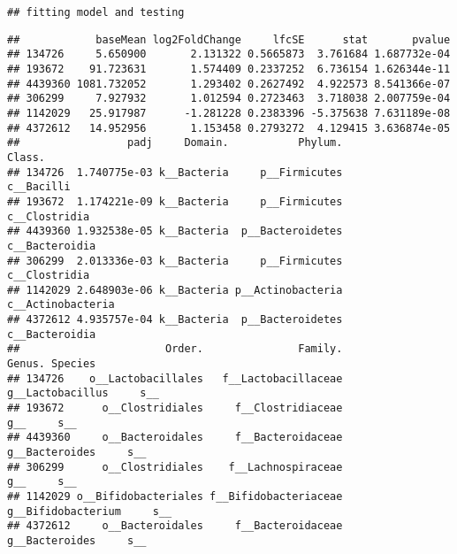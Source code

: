 \documentclass[
]{article}
\newenvironment{Shaded}{\begin{snugshade}}{\end{snugshade}}
\newcommand{\AttributeTok}[1]{\textcolor[rgb]{0.77,0.63,0.00}{#1}}
\newcommand{\ConstantTok}[1]{\textcolor[rgb]{0.00,0.00,0.00}{#1}}
\newcommand{\FloatTok}[1]{\textcolor[rgb]{0.00,0.00,0.81}{#1}}
\newcommand{\FunctionTok}[1]{\textcolor[rgb]{0.00,0.00,0.00}{#1}}
\newcommand{\NormalTok}[1]{#1}
\newcommand{\OtherTok}[1]{\textcolor[rgb]{0.56,0.35,0.01}{#1}}
\newcommand{\SpecialCharTok}[1]{\textcolor[rgb]{0.00,0.00,0.00}{#1}}
\newcommand{\StringTok}[1]{\textcolor[rgb]{0.31,0.60,0.02}{#1}}
\begin{document}
\begin{verbatim}
## fitting model and testing
\end{verbatim}

\begin{Shaded}
\end{Shaded}

\begin{verbatim}
##            baseMean log2FoldChange     lfcSE      stat       pvalue
## 134726     5.650900       2.131322 0.5665873  3.761684 1.687732e-04
## 193672    91.723631       1.574409 0.2337252  6.736154 1.626344e-11
## 4439360 1081.732052       1.293402 0.2627492  4.922573 8.541366e-07
## 306299     7.927932       1.012594 0.2723463  3.718038 2.007759e-04
## 1142029   25.917987      -1.281228 0.2383396 -5.375638 7.631189e-08
## 4372612   14.952956       1.153458 0.2793272  4.129415 3.636874e-05
##                 padj     Domain.           Phylum.            Class.
## 134726  1.740775e-03 k__Bacteria     p__Firmicutes        c__Bacilli
## 193672  1.174221e-09 k__Bacteria     p__Firmicutes     c__Clostridia
## 4439360 1.932538e-05 k__Bacteria  p__Bacteroidetes    c__Bacteroidia
## 306299  2.013336e-03 k__Bacteria     p__Firmicutes     c__Clostridia
## 1142029 2.648903e-06 k__Bacteria p__Actinobacteria c__Actinobacteria
## 4372612 4.935757e-04 k__Bacteria  p__Bacteroidetes    c__Bacteroidia
##                       Order.               Family.             Genus. Species
## 134726    o__Lactobacillales   f__Lactobacillaceae   g__Lactobacillus     s__
## 193672      o__Clostridiales     f__Clostridiaceae                g__     s__
## 4439360     o__Bacteroidales     f__Bacteroidaceae     g__Bacteroides     s__
## 306299      o__Clostridiales    f__Lachnospiraceae                g__     s__
## 1142029 o__Bifidobacteriales f__Bifidobacteriaceae g__Bifidobacterium     s__
## 4372612     o__Bacteroidales     f__Bacteroidaceae     g__Bacteroides     s__
\end{verbatim}
\end{document}
